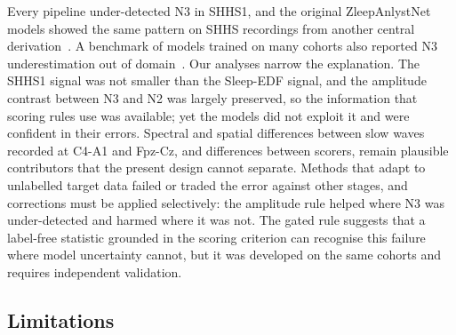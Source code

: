 \documentclass[11pt,a4paper]{article}
\begin{document}
Every pipeline under-detected N3 in SHHS1, and the original ZleepAnlystNet models showed the same
pattern on SHHS recordings from another central derivation~\cite{jadhav2024zleepanlystnet}. A
benchmark of models trained on many cohorts also reported N3 underestimation out of
domain~\cite{deirossi2025sleepyland}. Our analyses narrow the explanation. The SHHS1 signal was not
smaller than the Sleep-EDF signal, and the amplitude contrast between N3 and N2 was largely preserved,
so the information that scoring rules use was available; yet the models did not exploit it and were
confident in their errors. Spectral and spatial differences between slow waves recorded at C4-A1 and
Fpz-Cz, and differences between scorers, remain plausible contributors that the present design cannot
separate. Methods that adapt to unlabelled target data failed or traded the error against other
stages, and corrections must be applied selectively: the amplitude rule helped where N3 was
under-detected and harmed where it was not. The gated rule suggests that a label-free statistic
grounded in the scoring criterion can recognise this failure where model uncertainty cannot, but it
was developed on the same cohorts and requires independent validation.

\subsection{Limitations}
\end{document}
